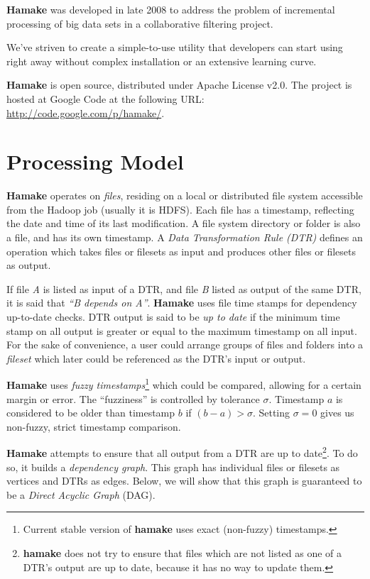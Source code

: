 \documentclass[10pt,conference,letterpaper]{IEEEtran}
\begin{document}
\textbf{Hamake} was developed in late 2008 to address the problem of
incremental processing of big data sets in a collaborative filtering
project.

We've striven to create a simple-to-use utility that developers can
start using right away without complex installation or an extensive
learning curve. 

\textbf{Hamake} is open source, distributed under Apache
License v2.0. The project is hosted at Google Code at the following
URL: \url{http://code.google.com/p/hamake/}.

\section{Processing Model}

\textbf{Hamake} operates on \textit{files}, residing on a local or
distributed file system accessible from the Hadoop job (usually it is
HDFS). Each file has a timestamp, reflecting the date and time of its last
modification. A file system directory or folder is also a file, and
has its own timestamp. A \textit{Data Transformation Rule (DTR)}
defines an operation which takes files or filesets as input and
produces other files or filesets as output.

If file \textit{A} is listed as input of a DTR, and file \textit{B}
listed as output of the same DTR, it is said that \textit{``B depends
  on A''}. \textbf{Hamake} uses file time stamps for dependency
up-to-date checks. DTR output is said to be \textit{up to date} if the
minimum time stamp on all output is greater or equal to the maximum
timestamp on all input. For the sake of convenience, a user could
arrange groups of files and folders into a \emph{fileset} which later
could be referenced as the DTR's input or output.

\textbf{Hamake} uses \textit{fuzzy timestamps}\footnote{Current stable
  version of \textbf{hamake} uses exact (non-fuzzy) timestamps.}
which could be compared, allowing for a certain margin or error. The
``fuzziness'' is controlled by tolerance $\sigma$. Timestamp $a$ is
considered to be older than timestamp $b$ if $(b-a)>\sigma$. Setting
$\sigma=0$ gives us non-fuzzy, strict timestamp comparison.

\textbf{Hamake} attempts to ensure that all output from a DTR are up to
date\footnote{\textbf{hamake} does not try to ensure that files which
  are not listed as one of a DTR's output are up to date, because it has
  no way to update them.}.  To do so, it builds a \textit{dependency
  graph}. This graph has individual files or filesets as vertices and
DTRs as edges. Below, we will show that this graph is guaranteed to be
a \textit{Direct Acyclic Graph} (DAG).
\end{document}
